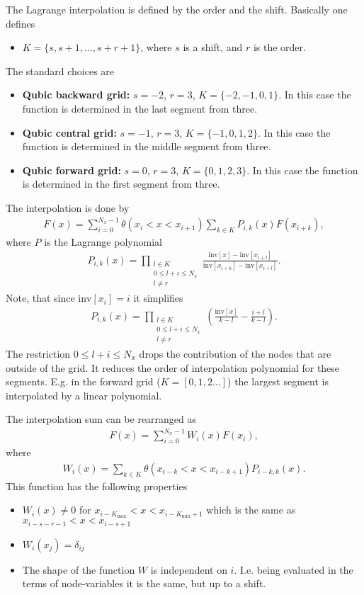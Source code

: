\documentclass[prd,nofootinbib,eqsecnum,final]{revtex4}
\renewcommand{\(}{\left(}
\renewcommand{\)}{\right)}
\renewcommand{\[}{\left[}
\renewcommand{\]}{\right]}
\begin{document}
The Lagrange interpolation is defined by the order and the shift. Basically one defines
\begin{itemize}
\item $K=\{s,s+1,...,s+r+1\}$, where $s$ is a shift, and $r$ is the order.
\end{itemize}
The standard choices are
\begin{itemize}
\item \textbf{Qubic backward grid:} $s=-2$, $r=3$, $K=\{-2,-1,0,1\}$. In this case the function is determined in the last segment from three.
\item \textbf{Qubic central grid:} $s=-1$, $r=3$, $K=\{-1,0,1,2\}$. In this case the function is determined in the middle segment from three.
\item \textbf{Qubic forward grid:} $s=0$, $r=3$, $K=\{0,1,2,3\}$. In this case the function is determined in the first segment from three.
\end{itemize}
The interpolation is done by
\begin{eqnarray}
F(x)=\sum_{i=0}^{N_x-1}\theta(x_i<x<x_{i+1})\sum_{k\in K} P_{i,k}(x)F(x_{i+k}),
\end{eqnarray}
where $P$ is the Lagrange polynomial
\begin{eqnarray}
P_{i,k}(x)
=\prod_{\substack{l\in K \\ 0\leq l+i\leq N_x \\ l\neq r}}\frac{\text{inv}[x]-\text{inv}[x_{i+l}]}{\text{inv}[x_{i+k}]-\text{inv}[x_{i+l}]}.
\end{eqnarray}
Note, that since $\text{inv}[x_{i}]=i$ it simplifies
\begin{eqnarray}
P_{i,k}(x)
=\prod_{\substack{l\in K\\0\leq l+i\leq N_x\\ l\neq r}}\(\frac{\text{inv}[x]}{k-l}-\frac{i+l}{k-l}\).
\end{eqnarray}
The restriction $0\leq l+i\leq N_x$ drops the contribution of the nodes that are outside of the grid. It reduces the order of interpolation polynomial for these segments. E.g. in the forward grid ($K=[0,1,2...]$) the largest segment is interpolated by a linear polynomial.

The interpolation sum can be rearranged as
\begin{eqnarray}
F(x)=\sum_{i=0}^{N_x-1}W_i(x)F(x_{i}),
\end{eqnarray}
where
\begin{eqnarray}
W_i(x)=\sum_{k\in K}\theta(x_{i-k}<x<x_{i-k+1})P_{i-k,k}(x).
\end{eqnarray}
This function has the following properties
\begin{itemize}
\item $W_i(x)\neq 0$ for $x_{i-K_\text{max}}<x<x_{i-K_\text{min}+1}$ which is the same as 
$x_{i-s-r-1}<x<x_{i-s+1}$
\item $W_i(x_j)=\delta_{ij}$
\item The shape of the function $W$ is independent on $i$. I.e. being evaluated in the terms of node-variables it is the same, but up to a shift.
\end{itemize}
\end{document}

